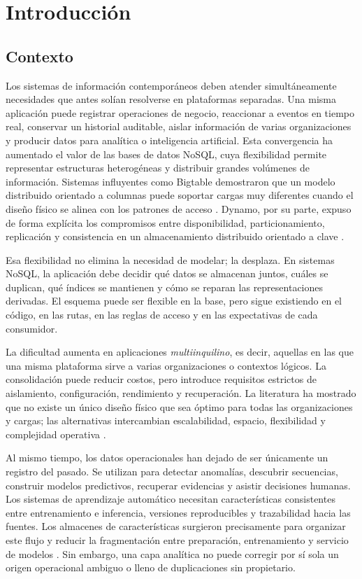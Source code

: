 \chapter{Introducción}
\label{ch:introduccion}

\section{Contexto}

Los sistemas de información contemporáneos deben atender simultáneamente necesidades
que antes solían resolverse en plataformas separadas. Una misma aplicación puede
registrar operaciones de negocio, reaccionar a eventos en tiempo real, conservar un
historial auditable, aislar información de varias organizaciones y producir datos para
analítica o inteligencia artificial. Esta convergencia ha aumentado el valor de las
bases de datos NoSQL, cuya flexibilidad permite representar estructuras heterogéneas y
distribuir grandes volúmenes de información. Sistemas influyentes como Bigtable
demostraron que un modelo distribuido orientado a columnas puede soportar cargas
muy diferentes cuando el diseño físico se alinea con los patrones de acceso
\parencite{chang2006bigtable}. Dynamo, por su parte, expuso de forma explícita los
compromisos entre disponibilidad, particionamiento, replicación y consistencia en un
almacenamiento distribuido orientado a clave \parencite{decandia2007dynamo}.

Esa flexibilidad no elimina la necesidad de modelar; la desplaza. En sistemas NoSQL,
la aplicación debe decidir qué datos se almacenan juntos, cuáles se duplican, qué
índices se mantienen y cómo se reparan las representaciones derivadas. El esquema puede
ser flexible en la base, pero sigue existiendo en el código, en las rutas, en las reglas
de acceso y en las expectativas de cada consumidor.

La dificultad aumenta en aplicaciones \emph{multiinquilino}, es decir, aquellas en las
que una misma plataforma sirve a varias organizaciones o contextos lógicos. La
consolidación puede reducir costos, pero introduce requisitos estrictos de aislamiento,
configuración, rendimiento y recuperación. La literatura ha mostrado que no existe un
único diseño físico que sea óptimo para todas las organizaciones y cargas; las alternativas
intercambian escalabilidad, espacio, flexibilidad y complejidad operativa
\parencite{aulbach2009flexibleschemas,ni2014adaptiveschema,rico2016multitarget}.

Al mismo tiempo, los datos operacionales han dejado de ser únicamente un registro del
pasado. Se utilizan para detectar anomalías, descubrir secuencias, construir modelos
predictivos, recuperar evidencias y asistir decisiones humanas. Los sistemas de
aprendizaje automático necesitan características consistentes entre entrenamiento e
inferencia, versiones reproducibles y trazabilidad hacia las fuentes. Los almacenes de
características surgieron precisamente para organizar este flujo y reducir la
fragmentación entre preparación, entrenamiento y servicio de modelos
\parencite{orr2021featurestores,li2023featurestore}. Sin embargo, una capa analítica no
puede corregir por sí sola un origen operacional ambiguo o lleno de duplicaciones sin
propietario.

